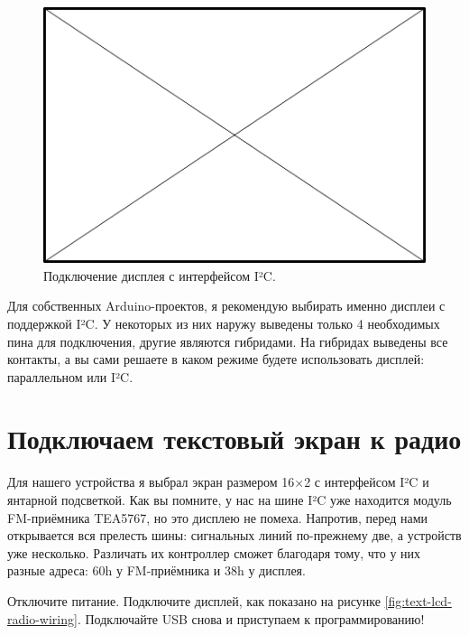 \begin{figure}
  \centering
  \includegraphics{TODO}
  \caption{Подключение дисплея с интерфейсом I²C.}
  \label{fig:text-lcd-i2c}
\end{figure}

Для собственных Arduino-проектов, я рекомендую выбирать именно дисплеи с поддержкой I²C. У некоторых из них наружу выведены только 4 необходимых пина для подключения, другие являются гибридами. На гибридах выведены все контакты, а вы сами решаете в каком режиме будете использовать дисплей: параллельном или I²C.

\section{Подключаем текстовый экран к радио}

Для нашего устройства я выбрал экран размером 16×2 с интерфейсом I²C и янтарной подсветкой. Как вы помните, у нас на шине I²C уже находится модуль FM-приёмника TEA5767, но это дисплею не помеха. Напротив, перед нами открывается вся прелесть шины: сигнальных линий по-прежнему две, а устройств уже несколько. Различать их контроллер сможет благодаря тому, что у них разные адреса: 60h у FM-приёмника и 38h у дисплея.

Отключите питание. Подключите дисплей, как показано на рисунке \ref{fig:text-lcd-radio-wiring}. Подключайте USB снова и приступаем к программированию!

